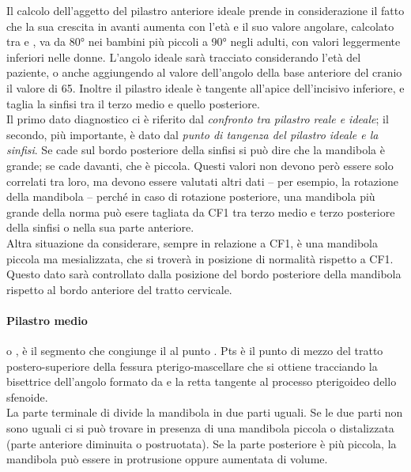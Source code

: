 Il calcolo dell'aggetto del pilastro anteriore ideale prende in considerazione il fatto che la sua crescita in avanti aumenta con l'età e il suo valore angolare, calcolato tra  e , va da 80° nei bambini più piccoli a 90° negli adulti, con valori leggermente inferiori nelle donne. L'angolo ideale sarà tracciato considerando l'età del paziente, o anche aggiungendo al valore dell'angolo della base anteriore del cranio il valore di 65. Inoltre il pilastro ideale è tangente all'apice dell'incisivo inferiore, e taglia la sinfisi tra il terzo medio e quello posteriore.\\

Il primo dato diagnostico ci è riferito dal \emph{confronto tra pilastro reale e ideale}; il secondo, più importante, è dato dal \emph{punto di tangenza del pilastro ideale e la sinfisi}. Se cade sul bordo posteriore della sinfisi si può dire che la mandibola è grande; se cade davanti, che è piccola. Questi valori non devono però essere solo correlati tra loro, ma devono essere valutati altri dati -- per esempio, la rotazione della mandibola -- perché in caso di rotazione posteriore, una mandibola più grande della norma può esere tagliata da CF1 tra terzo medio e terzo posteriore della sinfisi o nella sua parte anteriore.\\

Altra situazione da considerare, sempre in relazione a CF1, è una mandibola piccola ma mesializzata, che si troverà in posizione di normalità rispetto a CF1. Questo dato sarà controllato dalla posizione del bordo posteriore della mandibola rispetto al bordo anteriore del tratto cervicale.

\paragraph{Pilastro medio} o , è il segmento che congiunge il  al punto . Pts è il punto di mezzo del tratto postero-superiore della fessura pterigo-mascellare che si ottiene tracciando la bisettrice dell'angolo formato da  e la retta tangente al processo pterigoideo dello sfenoide.\\
La parte terminale di  divide la mandibola in due parti uguali. Se le due parti non sono uguali ci si può trovare in presenza di una mandibola piccola o distalizzata (parte anteriore diminuita o postruotata). Se la parte posteriore è più piccola, la mandibola può essere in protrusione oppure aumentata di volume.\\

